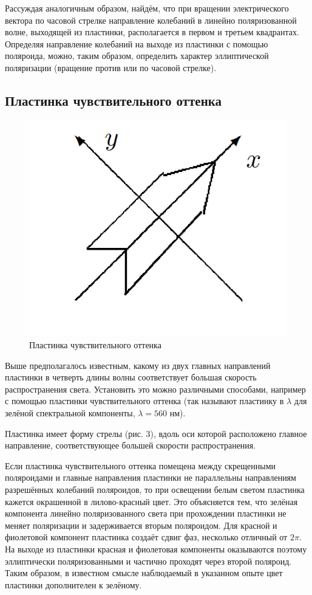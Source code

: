 \documentclass[a4paper, 12pt]{article}
\begin{document}
Рассуждая аналогичным образом, найдём, что при вращении электрического вектора по часовой стрелке направление колебаний в линейно поляризованной волне, выходящей из пластинки, располагается в первом и третьем квадрантах. Определяя направление колебаний на выходе из пластинки с помощью поляроида, можно, таким образом, определить характер эллиптической поляризации (вращение против или по часовой стрелке).

\subsection{Пластинка чувствительного оттенка}

\begin{figure}
	\includegraphics[width=\linewidth]{3}
	\caption{Пластинка
чувствительного
оттенка}
	\label{ris 3}
\end{figure}

Выше предполагалось известным, какому из двух главных направлений пластинки в четверть длины волны соответствует большая скорость распространения света.
Установить это можно различными способами, например с помощью
пластинки чувствительного оттенка (так называют пластинку в $ \lambda $
для зелёной спектральной компоненты, $ \lambda = 560 $ нм).

Пластинка имеет форму стрелы (рис. 3), вдоль оси которой расположено главное направление, соответствующее большей скорости распространения.

Если пластинка чувствительного оттенка помещена между скрещенными поляроидами и главные направления пластинки не параллельны
направлениям разрешённых колебаний поляроидов, то при освещении
белым светом пластинка кажется окрашенной в лилово-красный цвет.
Это объясняется тем, что зелёная компонента линейно поляризованного света при прохождении пластинки не меняет поляризации и задерживается вторым поляроидом. Для красной и фиолетовой компонент
пластинка создаёт сдвиг фаз, несколько отличный от $ 2\pi $. На выходе
из пластинки красная и фиолетовая компоненты оказываются поэтому
эллиптически поляризованными и частично проходят через второй поляроид. Таким образом, в известном смысле наблюдаемый в указанном
опыте цвет пластинки дополнителен к зелёному.
\end{document}
